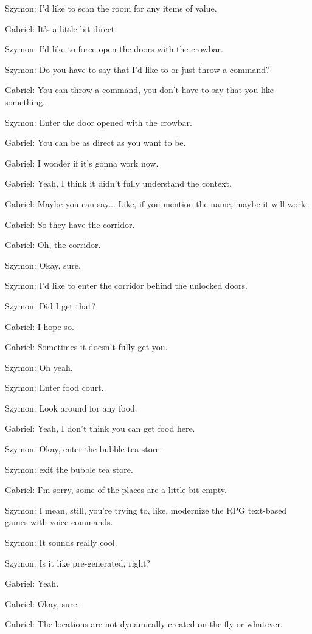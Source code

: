 Szymon: I'd like to scan the room for any items of value.

Gabriel: It's a little bit direct.

Szymon: I'd like to force open the doors with the crowbar.

Szymon: Do you have to say that I'd like to or just throw a command?

Gabriel: You can throw a command, you don't have to say that you like something.

Szymon: Enter the door opened with the crowbar.

Gabriel: You can be as direct as you want to be.

Gabriel: I wonder if it's gonna work now.

Gabriel: Yeah, I think it didn't fully understand the context.

Gabriel: Maybe you can say... Like, if you mention the name, maybe it will work.

Gabriel: So they have the corridor.

Gabriel: Oh, the corridor.

Szymon: Okay, sure.

Szymon: I'd like to enter the corridor behind the unlocked doors.

Szymon: Did I get that?

Gabriel: I hope so.

Gabriel: Sometimes it doesn't fully get you.

Szymon: Oh yeah.

Szymon: Enter food court.

Szymon: Look around for any food.

Gabriel: Yeah, I don't think you can get food here.

Szymon: Okay, enter the bubble tea store.

Szymon: exit the bubble tea store.

Gabriel: I'm sorry, some of the places are a little bit empty.

Szymon: I mean, still, you're trying to, like, modernize the RPG text-based games with voice commands.

Szymon: It sounds really cool.

Szymon: Is it like pre-generated, right?

Gabriel: Yeah.

Gabriel: Okay, sure.

Gabriel: The locations are not dynamically created on the fly or whatever.

